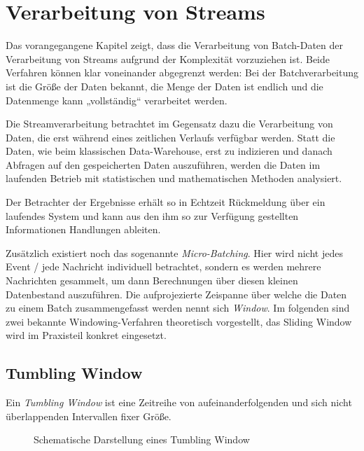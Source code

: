 \documentclass[a4paper,11pt]{scrartcl}
\begin{document}
  \section{Verarbeitung von Streams}
  Das vorangegangene Kapitel zeigt, dass die Verarbeitung von Batch-Daten der
  Verarbeitung von Streams aufgrund der Komplexität vorzuziehen ist. Beide
  Verfahren können klar voneinander abgegrenzt werden: Bei der Batchverarbeitung
  ist die Größe der Daten bekannt, die Menge der Daten ist endlich und die
  Datenmenge kann „vollständig“ verarbeitet werden.

  Die Streamverarbeitung betrachtet im Gegensatz dazu die Verarbeitung von Daten,
  die erst während eines zeitlichen Verlaufs verfügbar werden. Statt die Daten,
  wie beim klassischen Data-Warehouse, erst zu indizieren und danach Abfragen auf
  den gespeicherten Daten auszuführen, werden die Daten im laufenden Betrieb mit
  statistischen und mathematischen Methoden analysiert.

  Der Betrachter der Ergebnisse erhält so in Echtzeit Rückmeldung über ein
  laufendes System und kann aus den ihm so zur Verfügung gestellten Informationen
  Handlungen ableiten.

  Zusätzlich existiert noch das sogenannte \textit{Micro-Batching}. Hier wird
  nicht jedes Event / jede Nachricht individuell betrachtet, sondern es werden
  mehrere Nachrichten gesammelt, um dann Berechnungen über diesen kleinen
  Datenbestand auszuführen. Die aufprojezierte Zeispanne über welche die Daten zu
  einem Batch zusammengefasst werden nennt sich \textit{Window}. Im folgenden
  sind zwei bekannte Windowing-Verfahren theoretisch vorgestellt, das Sliding
  Window wird im Praxisteil konkret eingesetzt.

  \subsection{Tumbling Window}
  Ein \textit{Tumbling Window} ist eine Zeitreihe von
  aufeinanderfolgenden und sich nicht überlappenden Intervallen fixer
  Größe.
  \begin{figure}[!h]
    \centering
    \caption{Schematische Darstellung eines Tumbling Window}
  \end{figure}
\end{document}
